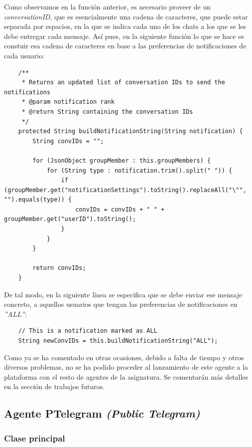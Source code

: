 Como observamos en la función anterior, es necesario proveer de un \textit{conversationID}, que es esencialmente una cadena de caracteres, que puede estar separada por espacios, en la que se indica cada uno de los chats a los que se les debe entregar cada mensaje. Así pues, en la siguiente función lo que se hace es constuir esa cadena de caracteres en base a las preferencias de notificaciones de cada usuario:\\

\begin{lstlisting}
    /**
     * Returns an updated list of conversation IDs to send the notifications
     * @param notification rank
     * @return String containing the conversation IDs
     */
    protected String buildNotificationString(String notification) {
        String convIDs = "";
        
        for (JsonObject groupMember : this.groupMembers) {
            for (String type : notification.trim().split(" ")) {
                if (groupMember.get("notificationSettings").toString().replaceAll("\"", "").equals(type)) {
                    convIDs = convIDs + " " + groupMember.get("userID").toString();
                }
            }
        }
        
        return convIDs;
    }
\end{lstlisting}

De tal modo, en la siguiente línea se especifica que se debe enviar ese mensaje concreto, a aquellos usuarios que tengan las preferencias de notificaciones en \textit{''ALL''}:\\

\begin{lstlisting}
    // This is a notification marked as ALL
    String newConvIDs = this.buildNotificationString("ALL");
\end{lstlisting}

Como ya se ha comentado en otras ocasiones, debido a falta de tiempo y otros diversos problemas, no se ha podido proceder al lanzamiento de este agente a la plataforma con el resto de agentes de la asignatura. Se comentarán más detalles en la sección de trabajos futuros.

\subsection{Agente PTelegram \textit{(Public Telegram)}}

\subsubsection{Clase principal}

